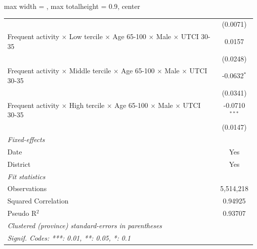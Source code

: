 \begin{table}[htbp]
\begin{adjustbox}{max width = \textwidth, max totalheight = 0.9\textheight, center}
\begin{tabular}{lc}
                                                                                                               & (0.0071)\\   
         Frequent activity $\times$ Low tercile $\times$ Age 65-100 $\times$ Male $\times$ UTCI 30-35          & 0.0157\\   
                                                                                                               & (0.0248)\\   
         Frequent activity $\times$ Middle tercile $\times$ Age 65-100 $\times$ Male $\times$ UTCI 30-35       & -0.0632$^{*}$\\   
                                                                                                               & (0.0341)\\   
         Frequent activity $\times$ High tercile $\times$ Age 65-100 $\times$ Male $\times$ UTCI 30-35         & -0.0710$^{***}$\\   
                                                                                                               & (0.0147)\\   
         \midrule
         \emph{Fixed-effects}\\
         Date                                                                                                  & Yes\\  
         District                                                                                              & Yes\\  
         \midrule
         \emph{Fit statistics}\\
         Observations                                                                                          & 5,514,218\\  
         Squared Correlation                                                                                   & 0.94925\\  
         Pseudo R$^2$                                                                                          & 0.93707\\  
         \midrule \midrule
         \multicolumn{2}{l}{\emph{Clustered (province) standard-errors in parentheses}}\\
         \multicolumn{2}{l}{\emph{Signif. Codes: ***: 0.01, **: 0.05, *: 0.1}}\\
      \end{tabular}
   \end{adjustbox}
\end{table}


